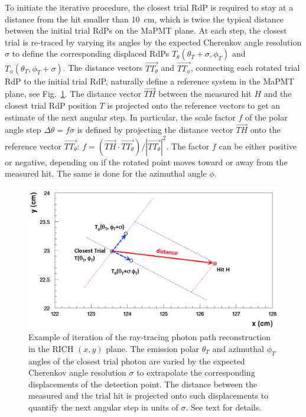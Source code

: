 To initiate the iterative procedure, the closest trial RdP is required to stay at a distance from the hit smaller than
10~cm, which is twice the typical distance between the initial trial RdPs on the MaPMT plane. At each step, the
closest trial is re-traced by varying its angles by the expected Cherenkov angle resolution $\sigma$ to define the
corresponding displaced RdPs $T_{\theta} (\theta_T + \sigma, \phi_T)$ and $T_{\phi}(\theta_T, \phi_T + \sigma)$.
The distance vectors $\overrightarrow{TT_\theta}$ and $\overrightarrow{TT_\phi}$, connecting each rotated trial
RdP to the initial trial RdP, naturally define a reference system in the MaPMT plane, see Fig.~\ref{Fig:RayAlgo}. The
distance vector $\overrightarrow{TH}$ between the measured hit $H$ and the closest trial RdP position $T$ is
projected onto the reference vectors to get an estimate of the next angular step. In particular, the scale factor
$f$ of the polar angle step $\Delta \theta = f \sigma$ is defined by projecting the distance vector
$\overrightarrow{TH}$ onto the reference vector $\overrightarrow{TT_\theta}$:
$f=(\overrightarrow{TH} \cdot \overrightarrow{TT_\theta}) / |\overrightarrow{TT_\theta}|^2$. The factor $f$ can
be either positive or negative, depending on if the rotated point moves toward or away from the measured hit. The
same is done for the azimuthal angle $\phi$. 

\begin{figure}[t]
\begin{center}
\includegraphics[width=1.0\columnwidth]{pics/ray_trace_example.png}
\end{center}
\caption{Example of iteration of the ray-tracing photon path reconstruction in the RICH $(x,y)$ plane. The emission
  polar $\theta_T$ and azimuthal $\phi_T$ angles of the closest trial photon are varied by the expected Cherenkov
  angle resolution $\sigma$ to extrapolate the corresponding displacements of the detection point. The distance
  between the measured and the trial hit is projected onto such displacements to quantify the next angular step in
  units of $\sigma$. See text for details.}
\label{Fig:RayAlgo}
\end{figure}

